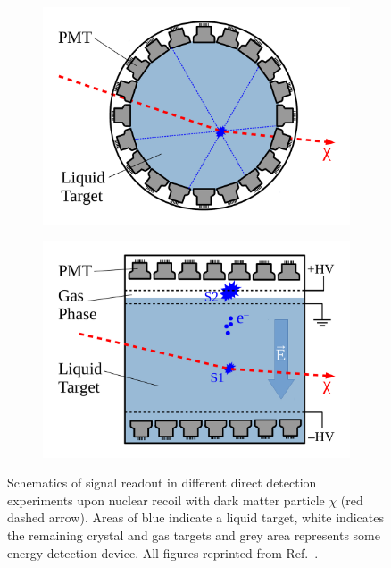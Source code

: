 \begin{figure}[!h]
\begin{subfigure}{0.49\textwidth}
         \includegraphics[width=\textwidth]{figures/DMOverview/singlephase.pdf}
         \caption{}
         \label{fig:DMOverview/singlephase}
     \end{subfigure}
     \hfill
     \begin{subfigure}{0.49\textwidth}
         \centering
         \includegraphics[width=\textwidth]{figures/DMOverview/dualphase.pdf}
         \caption{}
         \label{fig:DMOverview/dualphase}
     \end{subfigure}
     \caption[Schematics of signal readout in different direct detection experiments.]{Schematics of signal readout in different direct detection experiments upon nuclear recoil with dark matter particle $\chi$ (red dashed arrow). Areas of blue indicate a liquid target, white indicates the remaining crystal and gas targets and grey area represents some energy detection device. All figures reprinted from Ref.~\cite{Schumann:2019eaa}.}
     \label{fig:DMOverview/DDSetups}
\end{figure}


